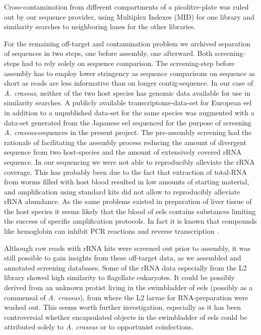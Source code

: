 \documentclass[10pt]{bmc_article}
\newenvironment{bmcformat}{\begin{raggedright}\baselineskip20pt\sloppy\setboolean{publ}{false}}{\end{raggedright}\baselineskip20pt\sloppy}
\begin{document}
\begin{bmcformat}
Cross-contamination from different compartments of a picolitre-plate
was ruled out by our sequence provider, using Multiplex Indexes (MID)
for one library and similarity searches to neighboring lanes for the
other libraries.

For the remaining off-target and contamination problem we archived
separation of sequences in two steps, one before assembly, one
afterward. Both screening-steps had to rely solely on sequence
comparison. The screening-step before assembly has to employ lower
stringency as sequence comparisons on sequence as short as reads are
less informative than on longer contig-sequence. In our case of
\textit{A. crassus}, neither of the two host species has genomic data
available for use in similarity searches. A publicly available
transcriptome-data-set for European eel \cite{pmid21080939} in addition
to a unpublished data-set for the same species was augmented with a
data-set generated from the Japanese eel sequenced for the purpose of
screening \textit{A. crassus}-sequences in the present project. The
pre-assembly screening had the rationale of facilitating the assembly
process reducing the amount of divergent sequence from two
host-species and the amount of extensively covered rRNA sequence. In
our sequencing we were not able to reproducibly alleviate the rRNA
coverage. This has probably been due to the fact that extraction of
total-RNA from worms filled with host blood resulted in low amounts of
starting material, and amplification using standard kits did not allow
to reproducibly alleviate rRNA abundance. As the same problems
existed in preparation of liver tissue of the host species it seems
likely that the blood of eels contains substances limiting the success
of specific amplification protocols. In fact it is known that
compounds like hemoglobin can inhibit PCR reactions \cite{pmid9327537}
and reverse transcription \cite{pmid16109794}.

Although raw reads with rRNA hits were screened out prior to assembly,
it was still possible to gain insights from these off-target data, as
we assembled and annotated screening databases. Some of the rRNA data
especially from the L2 library showed high similarity to flagellate
eukaryotes. It could be possibly derived from an unknown protist
living in the swimbladder of eels (possibly as a commensal of
\textit{A. crassus}), from where the L2 larvae for RNA-preparation were
washed out. This seems worth further investigation, especially as it
has been controversial whether encapsulated objects in the swimbladder
of eels could be attributed solely to \textit{A. crassus}
\cite{heitlinger_massive_2009} or to opportunist coinfections. 


\end{bmcformat}
\end{document}
